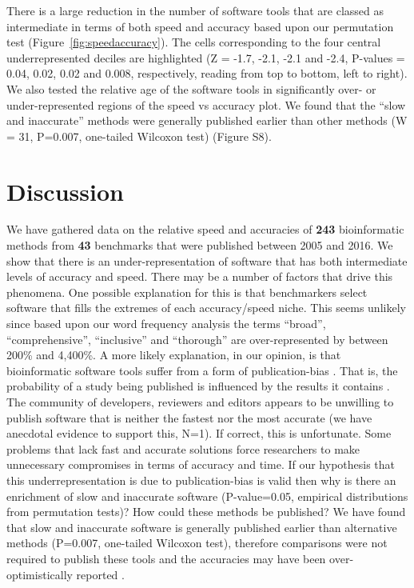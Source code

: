 \documentclass[fleqn,10pt]{SelfArx} %
\begin{document}
There is a large reduction in the number of software tools that are classed as intermediate in terms of both speed and accuracy based upon our permutation test (Figure~\ref{fig:speedaccuracy}). The cells corresponding to the four central underrepresented deciles are highlighted (Z = -1.7, -2.1, -2.1 and -2.4, P-values = 0.04, 0.02, 0.02 and 0.008, respectively, reading from top to bottom, left to right). We also tested the relative age of the software tools in significantly over- or under-represented regions of the speed vs accuracy plot. We found that the “slow and inaccurate” methods were generally published earlier than other methods (W = 31, P=0.007, one-tailed Wilcoxon test) (Figure S8).

\section*{Discussion}

We have gathered data on the relative speed and accuracies of \textbf{{\color{black}243}} bioinformatic methods from \textbf{{\color{black}43}} benchmarks that were published between 2005 and 2016. We show that there is an under-representation of software that has both intermediate levels of accuracy and speed. There may be a number of factors that drive this phenomena. One possible explanation for this is that benchmarkers select software that fills the extremes of each accuracy/speed niche. This seems unlikely since based upon our word frequency analysis the terms ``broad'', ``comprehensive'', ``inclusive'' and ``thorough'' are over-represented by between 200\% and 4,400\%.  A more likely explanation, in our opinion, is that bioinformatic software tools suffer from a form of publication-bias \cite{Boulesteix2015-am,Nissen:2016}. That is, the probability of a study being published is influenced by the results it contains \cite{sterling1959publication}. The community of developers, reviewers and editors appears to be unwilling to publish software that is neither the fastest nor the most accurate (we have anecdotal evidence to support this, N=1). If correct, this is unfortunate. Some problems that lack fast and accurate solutions force researchers to make unnecessary compromises in terms of accuracy and time. If our hypothesis that this underrepresentation is due to publication-bias is valid then why is there an enrichment of slow and inaccurate software (P-value=0.05, empirical distributions from permutation tests)? How could these methods be published? We have found that slow and inaccurate software is generally published earlier than alternative methods (P=0.007, one-tailed Wilcoxon test), therefore comparisons were not required to publish these tools and the accuracies may have been over-optimistically reported \cite{Boulesteix2015-nc}.
\end{document}
